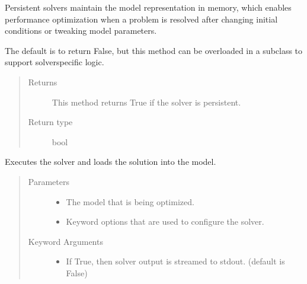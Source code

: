 \documentclass[letterpaper,10pt,english]{sphinxmanual}
\begin{document}
\begin{fulllineitems}
\begin{fulllineitems}
Persistent solvers maintain the model representation in memory,
which enables performance optimization when a problem is resolved
after changing initial conditions or tweaking model parameters.

The default is to return False, but this method can be overloaded
in a subclass to support solver\sphinxhyphen{}specific logic.
\begin{quote}\begin{description}
\item[{Returns}] \leavevmode
This method returns True if the solver is persistent.

\item[{Return type}] \leavevmode
bool

\end{description}\end{quote}

\end{fulllineitems}


\begin{fulllineitems}
\label{\detokenize{reference/solverapi:pao.common.solver.SolverAPI.solve}}
Executes the solver and loads the solution into the model.
\begin{quote}\begin{description}
\item[{Parameters}] \leavevmode\begin{itemize}
\item {} 
 \textendash{} The model that is being optimized.

\item {} 
 \textendash{} Keyword options that are used to configure the solver.

\end{itemize}

\item[{Keyword Arguments}] \leavevmode\begin{itemize}
\item {} 
 \textendash{} If True, then solver output is streamed to stdout. (default is False)


\end{itemize}
\end{description}
\end{quote}
\end{fulllineitems}
\end{fulllineitems}
\end{document}
